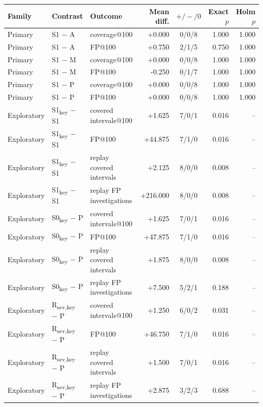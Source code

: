 \documentclass[pdflatex,sn-basic,Numbered]{sn-jnl}
\begin{document}
\begin{tableorg}[t]
\centering
\caption{Paired sign-flip tests with scenarios as units. Primary: prespecified family, Holm-adjusted. Exploratory: specified after results were seen, unadjusted. Differences are first minus second ranker; $+/-/0$ counts scenarios.}
\label{tab:tests}
\footnotesize
\begin{tabular}{lllrcrr}
\toprule
Family & Contrast & Outcome & Mean diff. & $+/-/0$ & Exact $p$ & Holm $p$ \\
\midrule
Primary & S1 $-$ A & coverage@100 & +0.000 & 0/0/8 & 1.000 & 1.000 \\
Primary & S1 $-$ A & FP@100 & +0.750 & 2/1/5 & 0.750 & 1.000 \\
Primary & S1 $-$ M & coverage@100 & +0.000 & 0/0/8 & 1.000 & 1.000 \\
Primary & S1 $-$ M & FP@100 & -0.250 & 0/1/7 & 1.000 & 1.000 \\
Primary & S1 $-$ P & coverage@100 & +0.000 & 0/0/8 & 1.000 & 1.000 \\
Primary & S1 $-$ P & FP@100 & +0.000 & 0/0/8 & 1.000 & 1.000 \\
\midrule
Exploratory & S1\textsubscript{key} $-$ S1 & covered intervals@100 & +1.625 & 7/0/1 & 0.016 & -- \\
Exploratory & S1\textsubscript{key} $-$ S1 & FP@100 & +44.875 & 7/1/0 & 0.016 & -- \\
Exploratory & S1\textsubscript{key} $-$ S1 & replay covered intervals & +2.125 & 8/0/0 & 0.008 & -- \\
Exploratory & S1\textsubscript{key} $-$ S1 & replay FP investigations & +216.000 & 8/0/0 & 0.008 & -- \\
Exploratory & S0\textsubscript{key} $-$ P & covered intervals@100 & +1.625 & 7/0/1 & 0.016 & -- \\
Exploratory & S0\textsubscript{key} $-$ P & FP@100 & +47.875 & 7/1/0 & 0.016 & -- \\
Exploratory & S0\textsubscript{key} $-$ P & replay covered intervals & +1.875 & 8/0/0 & 0.008 & -- \\
Exploratory & S0\textsubscript{key} $-$ P & replay FP investigations & +7.500 & 5/2/1 & 0.188 & -- \\
Exploratory & R\textsubscript{sev,key} $-$ P & covered intervals@100 & +1.250 & 6/0/2 & 0.031 & -- \\
Exploratory & R\textsubscript{sev,key} $-$ P & FP@100 & +46.750 & 7/1/0 & 0.016 & -- \\
Exploratory & R\textsubscript{sev,key} $-$ P & replay covered intervals & +1.500 & 7/0/1 & 0.016 & -- \\
Exploratory & R\textsubscript{sev,key} $-$ P & replay FP investigations & +2.875 & 3/2/3 & 0.688 & -- \\
\bottomrule
\end{tabular}
\unskip
\end{tableorg}
\end{document}
